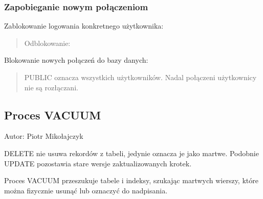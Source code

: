 \documentclass[a4paper,11pt,openany,english]{sphinxmanual}
\begin{document}
\subsubsection{Zapobieganie nowym połączeniom}
\label{\detokenize{rozdzial2/Kontrola_i_konserwacja/kontrola_i_konserwacja:zapobieganie-nowym-polaczeniom}}
\sphinxAtStartPar
Zablokowanie logowania konkretnego użytkownika:
\begin{quote}

\begin{sphinxVerbatim}[commandchars=\\\{\}]
\end{sphinxVerbatim}

\sphinxAtStartPar
Odblokowanie:

\begin{sphinxVerbatim}[commandchars=\\\{\}]
\end{sphinxVerbatim}
\end{quote}

\sphinxAtStartPar
Blokowanie nowych połączeń do bazy danych:
\begin{quote}

\begin{sphinxVerbatim}[commandchars=\\\{\}]
\end{sphinxVerbatim}

\sphinxAtStartPar
PUBLIC oznacza wszystkich użytkowników. Nadal połączeni użytkownicy nie są rozłączani.
\end{quote}


\subsection{Proces VACUUM}
\label{\detokenize{rozdzial2/Kontrola_i_konserwacja/kontrola_i_konserwacja:proces-vacuum}}
\sphinxAtStartPar
Autor: Piotr Mikołajczyk

\sphinxAtStartPar
DELETE nie usuwa rekordów z tabeli, jedynie oznacza je jako martwe. Podobnie UPDATE pozostawia stare wersje zaktualizowanych krotek.

\sphinxAtStartPar
Proces VACUUM przeszukuje tabele i indeksy, szukając martwych wierszy, które można fizycznie usunąć lub oznaczyć do nadpisania.
\end{document}
